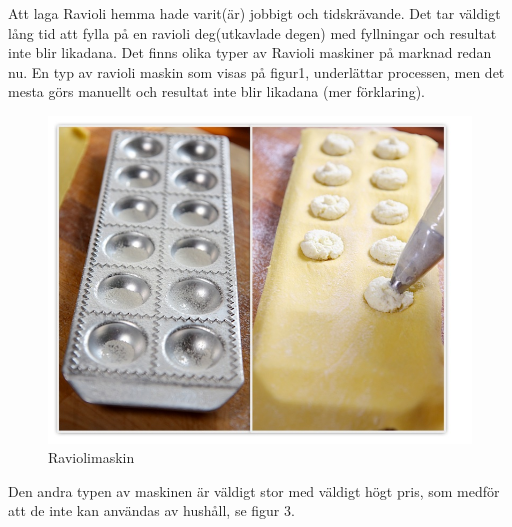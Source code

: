 Att laga Ravioli hemma hade varit(är) jobbigt och tidskrävande. Det tar väldigt lång tid att fylla på en ravioli deg(utkavlade degen) med fyllningar och resultat inte blir likadana.
Det finns olika typer av Ravioli maskiner på marknad redan nu. En typ av ravioli maskin som visas på figur1, underlättar processen, men det mesta görs manuellt och resultat inte blir likadana (mer förklaring).\\

	 		 		\begin{figure}[h]
	 		 			\begin{center}
	 		 				\includegraphics[scale=0.5]{images/raviolimoldwithfilling.jpg}
	 		 				\caption{Raviolimaskin}
	 		 				\label{ravioli}	
	 		 			\end{center}
	 		 		\end{figure}
Den andra typen av maskinen är väldigt stor med väldigt högt pris, som medför att de inte kan användas av hushåll, se figur 3.
